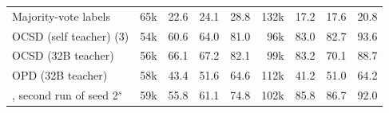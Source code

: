 \begin{tabular}{l r c c c r c c c }
Majority-vote labels & 65k & 22.6\sigup{} & 24.1\sigup{} & 28.8 & 132k & 17.2\sigup{} & 17.6\sigup{} & 20.8 \\
OCSD (self teacher) (3) & 54k & 60.6\sigdn{} & 64.0\sigdn{} & 81.0 & 96k & 83.0\sigup{} & 82.7\sigup{} & 93.6 \\
OCSD (32B teacher) & 56k & 66.1\sigdn{} & 67.2\sigdn{} & 82.1 & 99k & 83.2 & 70.1\sigup{} & 88.7 \\
OPD (32B teacher) & 58k & 43.4\sigup{} & 51.6\sigup{} & 64.6 & 112k & 41.2\sigup{} & 51.0\sigup{} & 64.2 \\
\wmppo{}, second run of seed 2$^{s}$ & 59k & 55.8 & 61.1 & 74.8 & 102k & 85.8 & 86.7 & 92.0 \\
\bottomrule
\end{tabular}
